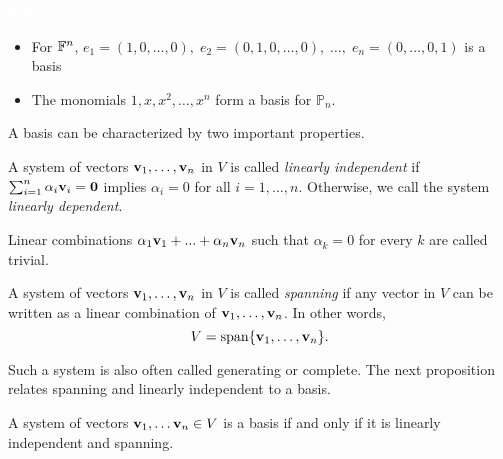 \documentclass{article}
\begin{document}
\begin{example}
\textcolor{white}{Skip}
\begin{itemize}
    \item For ${\mathbb{F}}^n$, $e_1 = (1,0,\ldots, 0), \; e_2 = (0,1,0,\ldots,0), \; \ldots, \; e_n = (0, \ldots, 0, 1)$ is a basis
    \item The monomials $ 1, x, x^2, \ldots, x^n$ form a basis for $\mathbb{P}_n$.
\end{itemize}
\end{example}

A basis can be characterized by two important properties.

\begin{definition}
A system of vectors ${\mathbf{v}}_1,\ldots,{\mathbf{v}}_n$ in $V$ is called \emph{linearly independent} if $\sum_{i=1}^n \alpha_i{\mathbf{v}}_i = {\mathbf{0}}$ implies $\alpha_i=0$ for all $i=1,\ldots,n$. Otherwise, we call the system \emph{linearly dependent}.
\end{definition}

Linear combinations  $\alpha_{1}{\mathbf{v}}_{1}+...+\alpha_{n}{\mathbf{v}}_{n}$  such that  $\alpha_k = 0$ for every $k$ are called trivial.

\begin{definition}
 A system of vectors ${\mathbf{v}}_1,\ldots,{\mathbf{v}}_n$ in $V$ is called \emph{spanning}  if any vector in $V$ can be written as a linear combination of ${\mathbf{v}}_1,\ldots,{\mathbf{v}}_n$. In other words,
\begin{equation*}
    V = \mathrm{span}\{{\mathbf{v}}_1,\ldots,{\mathbf{v}}_n\}.
\end{equation*}
\end{definition}

Such a system is also often called generating or complete. The next proposition relates spanning and linearly independent to a basis. 

\begin{proposition}
\label{prop:lin_indep_span_basis}
 A system of vectors ${\mathbf{v}}_1, \ldots {\mathbf{v}}_n \in V$ is a basis if and only if it is linearly independent and spanning.
\end{proposition}
\end{document}
